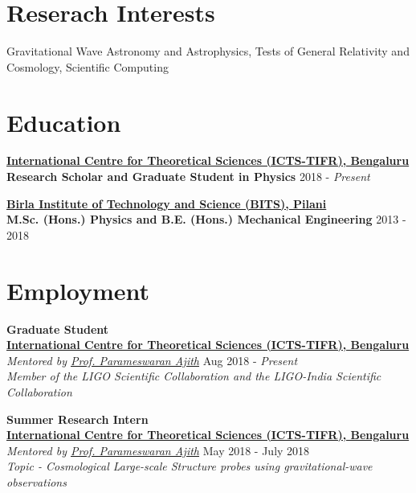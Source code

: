 \documentclass[margin, centered]{res}
\begin{document}
\begin{resume}

\section{Reserach Interests}
Gravitational Wave Astronomy and Astrophysics, Tests of General Relativity and Cosmology, Scientific Computing 
\\
\section{Education}
\textbf{\href{https://www.icts.res.in/}{International Centre for Theoretical Sciences (ICTS-TIFR), Bengaluru}}\\
\textbf{Research Scholar and Graduate Student in Physics} \hfill 2018 - \textit{Present}

\textbf{\href{http://www.bits-pilani.ac.in/}{Birla Institute of Technology and Science (BITS), Pilani}}\\
\textbf{M.Sc. (Hons.) Physics and B.E. (Hons.) Mechanical Engineering} \hfill 2013 - 2018

\section{Employment}
\textbf{Graduate Student}
\\
\textbf{\href{https://www.icts.res.in/}{International Centre for Theoretical Sciences (ICTS-TIFR), Bengaluru}}\\
\emph{Mentored by \href{https://home.icts.res.in/~ajith/Home.html}{Prof. Parameswaran Ajith}} \hfill Aug 2018 - \textit{Present}\\
\textit{Member of the LIGO Scientific Collaboration and the LIGO-India Scientific Collaboration}

\textbf{Summer Research Intern}
\\
\textbf{\href{https://www.icts.res.in/}{International Centre for Theoretical Sciences (ICTS-TIFR), Bengaluru}}\\
\emph{Mentored by \href{https://home.icts.res.in/~ajith/Home.html}{Prof. Parameswaran Ajith}} \hfill May 2018 - July 2018\\
\textit{Topic - Cosmological Large-scale Structure probes using gravitational-wave observations}


\end{resume}
\end{document}
